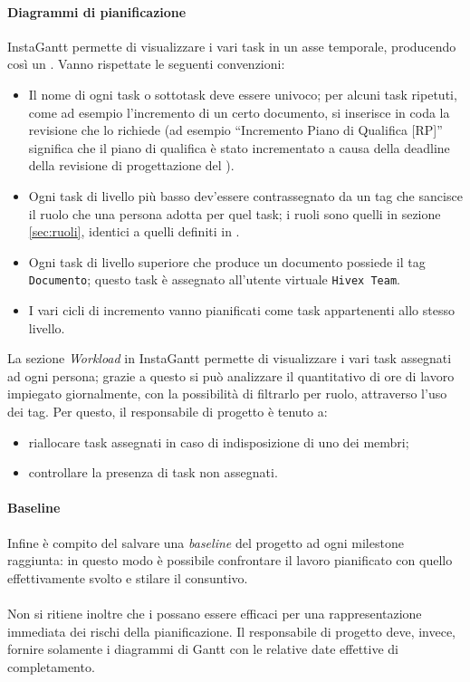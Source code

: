 \paragraph{Diagrammi di pianificazione}
InstaGantt permette di visualizzare i vari task in un asse temporale, producendo così un . 
Vanno rispettate le seguenti convenzioni:
\begin{itemize}
	\item Il nome di ogni task o sottotask deve essere univoco; per alcuni task ripetuti, come ad esempio l'incremento di un certo documento, si inserisce in coda la revisione che lo richiede (ad esempio “Incremento Piano di Qualifica [RP]” significa che il piano di qualifica è stato incrementato a causa della deadline della revisione di progettazione del \TV).
	\item Ogni task di livello più basso dev'essere contrassegnato da un tag che sancisce il ruolo che una persona adotta per quel task; i ruoli sono quelli in sezione \ref{sec:ruoli}, identici a quelli definiti in \PdP.
	\item Ogni task di livello superiore che produce un documento possiede il tag \texttt{Documento}; questo task è assegnato all'utente virtuale \texttt{Hivex Team}.
	\item I vari cicli di incremento vanno pianificati come task appartenenti allo stesso livello.
\end{itemize}
La sezione \emph{Workload} in InstaGantt permette di visualizzare i vari task assegnati ad ogni persona; grazie a questo si può analizzare il quantitativo di ore di lavoro impiegato giornalmente, con la possibilità di filtrarlo per ruolo, attraverso l'uso dei tag. Per questo, il responsabile di progetto è tenuto a:
\begin{itemize}
	\item riallocare task assegnati in caso di indisposizione di uno dei membri;
	\item controllare la presenza di task non assegnati.
\end{itemize}

\paragraph{Baseline} Infine è compito del  salvare una \emph{baseline} del progetto ad ogni milestone raggiunta: in questo modo è possibile confrontare il lavoro pianificato con quello effettivamente svolto e stilare il consuntivo.

\paragraph{} Non si ritiene inoltre che i  possano essere efficaci per una rappresentazione immediata dei rischi della pianificazione. Il responsabile di progetto deve, invece, fornire solamente i diagrammi di Gantt con le relative date effettive di completamento.




